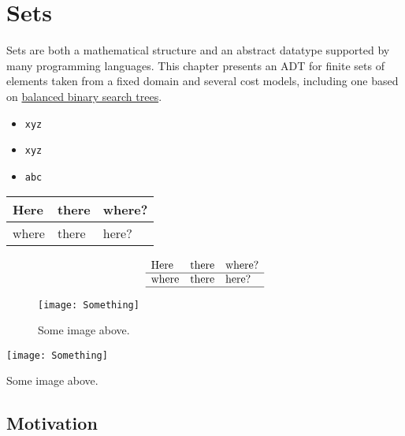 \chapter{Sets}
\label{XXch:sets}

\begin{preamble}
  Sets are both a mathematical structure and an abstract datatype
  supported by many programming languages.  This chapter presents an ADT for
  finite sets of elements taken from a fixed domain and several cost models, including one based on \href{ch:bst::adt}{balanced binary search trees}.
\begin{itemize}
\item
\lstinline'xyz'
\item
\lstinline`xyz`
\item
\lstinline!abc! 
\end{itemize}
\end{preamble}

\begin{table}
\begin{tabular}{lll}
Here & there & where? 
\\ \hline
where & there & here? 
\\ \hline
\end{tabular}
\end{table}


\begin{table}
\[
\begin{array}{lll}
\mbox{Here} & \mbox{there} & \mbox{where?} 
\\ \hline
\mbox{where} & \mbox{there} & \mbox{here?} 
\\ \hline
\end{array}
\]
\end{table}

\begin{figure}
\texttt{[image: Something]}
\caption{Some image above.}
\end{figure}


\begin{table}
\texttt{[image: Something]}
\caption{Some image above.}
\end{table}

\section{Motivation}
\label{XXsec:sets::math}


